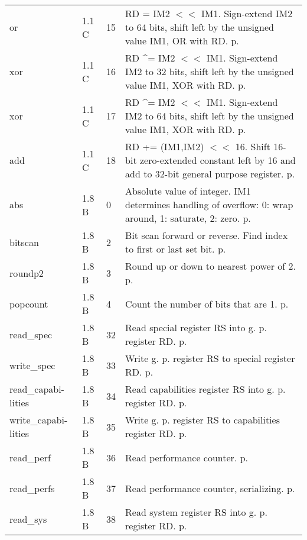 \documentclass[forwardcom.tex]{subfiles}
\begin{document}
\begin{longtable} {|p{25mm}|p{14mm}|p{10mm}|p{95mm}|}
or            & 1.1 C & 15  & RD \textbar{}= IM2 $<<$ IM1. Sign-extend IM2 to 64 bits, shift left by the unsigned value IM1, OR with RD. p. \pageref{table:orInstruction} \\
xor           & 1.1 C & 16  & RD \^{}= IM2 $<<$ IM1. Sign-extend IM2 to 32 bits, shift left by the unsigned value IM1, XOR with RD. p. \pageref{table:xorInstruction} \\
xor           & 1.1 C & 17  & RD \^{}= IM2 $<<$ IM1. Sign-extend IM2 to 64 bits, shift left by the unsigned value IM1, XOR with RD. p. \pageref{table:xorInstruction} \\
add           & 1.1 C & 18  & RD += (IM1,IM2) $<<$ 16. Shift 16-bit zero-extended constant left by 16 and add to 32-bit general purpose register. p. \pageref{table:addInstruction} \\
abs           & 1.8 B &  0  & Absolute value of integer. IM1 determines handling of overflow: 0: wrap around, 1: saturate, 2: zero. p. \pageref{table:absInstruction} \\
bitscan       & 1.8 B &  2 & Bit scan forward or reverse. Find index to first or last set bit. p. \pageref{table:bitscanInstruction} \\
roundp2       & 1.8 B &  3 & Round up or down to nearest power of 2. p. \pageref{table:roundP2Instruction} \\
popcount      & 1.8 B &  4 & Count the number of bits that are 1. p. \pageref{table:popcountInstruction}\\
read\_spec    & 1.8 B & 32  & Read special register RS into g. p. register RD. p. \pageref{table:readSpecInstruction} \\
write\_spec   & 1.8 B & 33  & Write g. p. register RS to special register RD. p. \pageref{table:readSpecInstruction} \\
read\_capabi-lities & 1.8 B & 34  & Read capabilities register RS into g. p. register RD. p. \pageref{table:readCapabilitiesInstruction} \\
write\_capabi-lities & 1.8 B & 35  & Write g. p. register RS to capabilities register RD. p. \pageref{table:writeCapabilitiesInstruction} \\
read\_perf    & 1.8 B & 36  & Read performance counter. p. \pageref{table:readPerfInstruction} \\
read\_perfs   & 1.8 B & 37  & Read performance counter, serializing. p. \pageref{table:readPerfSInstruction} \\
read\_sys     & 1.8 B & 38  & Read system register RS into g. p. register RD. p. \pageref{table:readSysInstruction} \\

\end{longtable}
\end{document}
